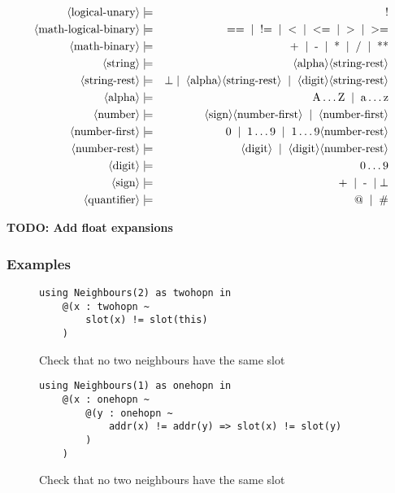 \begin{eqnarray*}
	\pn{logical-unary} & \pp & \sm{!} \\
	\pn{math-logical-binary} & \pp & \sm{==} \oo \sm{!=} \oo \sm{\textless} \oo \sm{\textless=} \oo \sm{\textgreater} \oo \sm{\textgreater=} \\
	\pn{math-binary} & \pp & \sm{+} \oo \sm{-} \oo \sm{*} \oo \sm{/} \oo \sm{**} \\
%
	\pn{string} & \pp & \pn{alpha}\pn{string-rest} \\
	\pn{string-rest} & \pp & \nn \oo \pn{alpha}\pn{string-rest} \oo \pn{digit}\pn{string-rest} \\
%
	\pn{alpha} & \pp & \sm{A}\dots\sm{Z} \oo \sm{a}\dots\sm{z} \\
	\pn{number} & \pp & \pn{sign} \pn{number-first} \oo \pn{number-first} \\
	\pn{number-first} & \pp & \sm{0} \oo \sm{1}\dots\sm{9} \oo \sm{1}\dots\sm{9}\pn{number-rest} \\
	\pn{number-rest} & \pp & \pn{digit} \oo \pn{digit}\pn{number-rest} \\
	\pn{digit} & \pp & \sm{0}\dots\sm{9} \\
	\pn{sign} & \pp & \sm{+} \oo \sm{-} \oo \nn \\
	\pn{quantifier} & \pp & \sm{@} \oo \sm{\#} \\
\end{eqnarray*}

\textbf{TODO: Add float expansions}

\subsubsection{Examples}

\begin{figure}[H]
\begin{verbatim}
using Neighbours(2) as twohopn in
    @(x : twohopn ~
        slot(x) != slot(this)
    )
\end{verbatim}
\caption{Check that no two neighbours have the same slot}
\end{figure}

\begin{figure}[H]
\begin{verbatim}
using Neighbours(1) as onehopn in
    @(x : onehopn ~
        @(y : onehopn ~
            addr(x) != addr(y) => slot(x) != slot(y)
        )
    )
\end{verbatim}
\caption{Check that no two neighbours have the same slot}
\end{figure}

